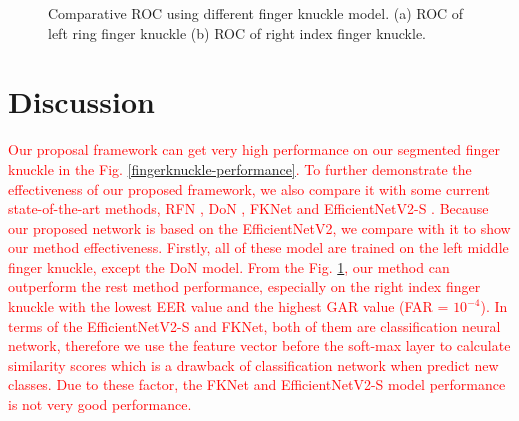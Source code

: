 \begin{figure}[ht]
    \centering
    \caption{Comparative ROC using different finger knuckle model. (a) ROC of left ring finger knuckle (b) ROC of right index finger knuckle.}
    \label{compare-fingerknuckle}
\end{figure}

\section{Discussion\label{discussion}}

\textcolor{red}{Our proposal framework can get very high performance on our segmented finger knuckle in the Fig. \ref{fingerknuckle-performance}. To further demonstrate the effectiveness of our proposed framework, we also compare it with some current state-of-the-art methods, RFN \cite{liu2020contactless}, DoN \cite{zheng20163d}, FKNet \cite{cheng2020deep} and EfficientNetV2-S \cite{tan2021efficientnetv2}. Because our proposed network is based on the EfficientNetV2, we compare with it to show our method effectiveness. Firstly, all of these model are trained on the left middle finger knuckle, except the DoN model. From the Fig. \ref{compare-fingerknuckle}, our method can outperform the rest method performance, especially on the right index finger knuckle with the lowest EER value and the highest GAR value (FAR = $10^{-4}$). In terms of the EfficientNetV2-S and FKNet, both of them are classification neural network, therefore we use the feature vector before the soft-max layer to calculate similarity scores which is a drawback of classification network when predict new classes. Due to these factor, the FKNet and EfficientNetV2-S model performance is not very good performance.}

